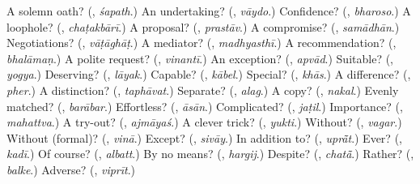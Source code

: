 \begin{tcolorbox}[breakable,colback=teal!4,colframe=teal!35!black,title={Before you move on}]
A solemn oath? (\textbf{}, \emph{śapath}.) An undertaking? (\textbf{}, \emph{vāydo}.) Confidence? (\textbf{}, \emph{bharoso}.) A loophole? (\textbf{}, \emph{chaṭakbārī}.) A proposal? (\textbf{}, \emph{prastāv}.) A compromise? (\textbf{}, \emph{samādhān}.) Negotiations? (\textbf{}, \emph{vāṭāghāṭ}.) A mediator? (\textbf{}, \emph{madhyasthī}.) A recommendation? (\textbf{}, \emph{bhalāmaṇ}.) A polite request? (\textbf{}, \emph{vinantī}.) An exception? (\textbf{}, \emph{apvād}.) Suitable? (\textbf{}, \emph{yogya}.) Deserving? (\textbf{}, \emph{lāyak}.) Capable? (\textbf{}, \emph{kābel}.) Special? (\textbf{}, \emph{khās}.) A difference? (\textbf{}, \emph{pher}.) A distinction? (\textbf{}, \emph{taphāvat}.) Separate? (\textbf{}, \emph{alag}.) A copy? (\textbf{}, \emph{nakal}.) Evenly matched? (\textbf{}, \emph{barābar}.) Effortless? (\textbf{}, \emph{āsān}.) Complicated? (\textbf{}, \emph{jaṭil}.) Importance? (\textbf{}, \emph{mahattva}.) A try-out? (\textbf{}, \emph{ajmāyaś}.) A clever trick? (\textbf{}, \emph{yukti}.) Without? (\textbf{}, \emph{vagar}.) Without (formal)? (\textbf{}, \emph{vinā}.) Except? (\textbf{}, \emph{sivāy}.) In addition to? (\textbf{}, \emph{uprā̃t}.) Ever? (\textbf{}, \emph{kadī}.) Of course? (\textbf{}, \emph{albatt}.) By no means? (\textbf{}, \emph{hargij}.) Despite? (\textbf{}, \emph{chatā̃}.) Rather? (\textbf{}, \emph{balke}.) Adverse? (\textbf{}, \emph{viprīt}.)
\end{tcolorbox}
